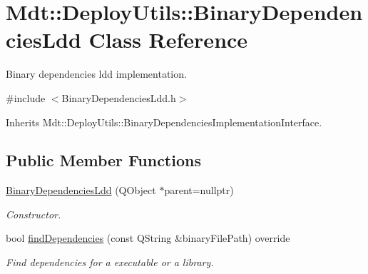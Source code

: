\hypertarget{class_mdt_1_1_deploy_utils_1_1_binary_dependencies_ldd}{}\section{Mdt\+:\+:Deploy\+Utils\+:\+:Binary\+Dependencies\+Ldd Class Reference}
\label{class_mdt_1_1_deploy_utils_1_1_binary_dependencies_ldd}


Binary dependencies ldd implementation.  




{\ttfamily \#include $<$Binary\+Dependencies\+Ldd.\+h$>$}



Inherits Mdt\+::\+Deploy\+Utils\+::\+Binary\+Dependencies\+Implementation\+Interface.

\subsection*{Public Member Functions}
\begin{DoxyCompactItemize}
\item 
\hyperlink{class_mdt_1_1_deploy_utils_1_1_binary_dependencies_ldd_a2c033911e76b53cd89ecfcb4d91dcf10}{Binary\+Dependencies\+Ldd} (Q\+Object $\ast$parent=nullptr)\hypertarget{class_mdt_1_1_deploy_utils_1_1_binary_dependencies_ldd_a2c033911e76b53cd89ecfcb4d91dcf10}{}\label{class_mdt_1_1_deploy_utils_1_1_binary_dependencies_ldd_a2c033911e76b53cd89ecfcb4d91dcf10}

\begin{DoxyCompactList}\small\item\em Constructor. \end{DoxyCompactList}\item 
bool \hyperlink{class_mdt_1_1_deploy_utils_1_1_binary_dependencies_ldd_a2e707c35408525ee49a0084ed1ee0555}{find\+Dependencies} (const Q\+String \&binary\+File\+Path) override\hypertarget{class_mdt_1_1_deploy_utils_1_1_binary_dependencies_ldd_a2e707c35408525ee49a0084ed1ee0555}{}\label{class_mdt_1_1_deploy_utils_1_1_binary_dependencies_ldd_a2e707c35408525ee49a0084ed1ee0555}

\begin{DoxyCompactList}\small\item\em Find dependencies for a executable or a library. \end{DoxyCompactList}\end{DoxyCompactItemize}


